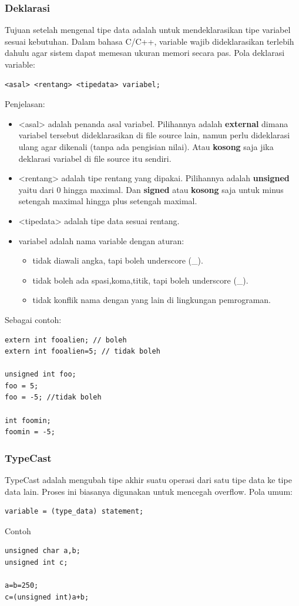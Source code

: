 \documentclass[12pt,]{article}
\begin{document}
	\subsubsection{Deklarasi}
	Tujuan setelah mengenal tipe data adalah untuk mendeklarasikan tipe variabel sesuai kebutuhan.
	Dalam bahasa C/C++, variable wajib dideklarasikan terlebih dahulu agar sistem dapat memesan ukuran memori secara pas.
	Pola deklarasi variable:
	\begin{verbatim}
<asal> <rentang> <tipedata> variabel;
	\end{verbatim}
	Penjelasan:
	\begin{itemize}
		\item <asal> adalah penanda asal variabel. Pilihannya adalah \textbf{external} dimana variabel tersebut dideklarasikan di file source lain,
		namun perlu dideklarasi ulang agar dikenali (tanpa ada pengisian nilai).
		Atau \textbf{kosong} saja jika deklarasi variabel di file source itu sendiri.
		\item <rentang> adalah tipe rentang yang dipakai.
		Pilihannya adalah \textbf{unsigned} yaitu dari 0 hingga maximal.
		Dan \textbf{signed} atau \textbf{kosong} saja untuk minus setengah maximal hingga plus setengah maximal.
		\item <tipedata> adalah tipe data sesuai rentang.
		\item variabel adalah nama variable dengan aturan:
		\begin{itemize}
			\item tidak diawali angka, tapi boleh underscore (\_).
			\item tidak boleh ada spasi,koma,titik, tapi boleh underscore (\_).
			\item tidak konflik nama dengan yang lain di lingkungan pemrograman.
		\end{itemize}
	\end{itemize}

	Sebagai contoh:
	\begin{verbatim}
extern int fooalien; // boleh
extern int fooalien=5; // tidak boleh

unsigned int foo;
foo = 5;
foo = -5; //tidak boleh

int foomin;
foomin = -5;
	\end{verbatim}
	
	\subsubsection{TypeCast}
	TypeCast adalah mengubah tipe akhir suatu operasi dari satu tipe data ke tipe data lain.
	Proses ini biasanya digunakan untuk mencegah overflow.
	Pola umum:
	\begin{verbatim}
variable = (type_data) statement;
	\end{verbatim}
	Contoh
	\begin{verbatim}
unsigned char a,b;
unsigned int c;

a=b=250;
c=(unsigned int)a+b;
	\end{verbatim}
	
\end{document}
